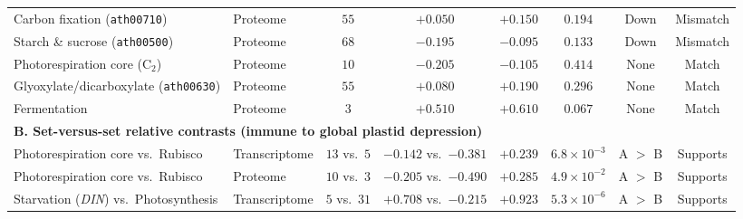 \documentclass[preprint,11pt,numbers,sort&compress]{elsarticle}
\begin{document}
\begin{table}[tbp]
{\begin{tabular}{llcccccc}
Carbon fixation (\texttt{ath00710}) & Proteome & $55$ & $+0.050$ & $+0.150$ & $0.194$ & Down & Mismatch \\
Starch \& sucrose (\texttt{ath00500}) & Proteome & $68$ & $-0.195$ & $-0.095$ & $0.133$ & Down & Mismatch \\
Photorespiration core ($\mathrm{C_2}$) & Proteome & $10$ & $-0.205$ & $-0.105$ & $0.414$ & None & Match \\
Glyoxylate/dicarboxylate (\texttt{ath00630}) & Proteome & $55$ & $+0.080$ & $+0.190$ & $0.296$ & None & Match \\
Fermentation & Proteome & $3$ & $+0.510$ & $+0.610$ & $0.067$ & None & Match \\
\midrule
\multicolumn{8}{l}{\textbf{B. Set-versus-set relative contrasts (immune to global plastid depression)}} \\
\midrule
Photorespiration core vs.\ Rubisco & Transcriptome & $13$ vs.\ $5$ & $-0.142$ vs.\ $-0.381$ & $+0.239$ & $6.8\times 10^{-3}$ & A $>$ B & Supports \\
Photorespiration core vs.\ Rubisco & Proteome & $10$ vs.\ $3$ & $-0.205$ vs.\ $-0.490$ & $+0.285$ & $4.9\times 10^{-2}$ & A $>$ B & Supports \\
Starvation (\textit{DIN}) vs.\ Photosynthesis & Transcriptome & $5$ vs.\ $31$ & $+0.708$ vs.\ $-0.215$ & $+0.923$ & $5.3\times 10^{-6}$ & A $>$ B & Supports \\
\bottomrule
\end{tabular}%
}
\end{table}
\end{document}
